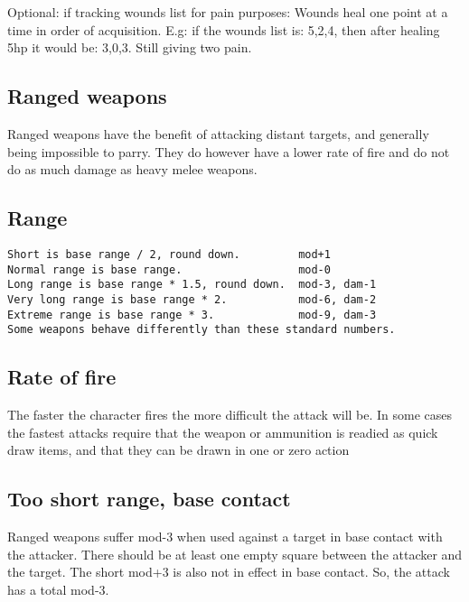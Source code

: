Optional: if tracking wounds list for pain purposes: Wounds heal one point at a time in order of acquisition. E.g: if the wounds list is: 5,2,4, then after healing 5hp it would be: 3,0,3. Still giving two pain.












\subsection*{Ranged weapons}
Ranged weapons have the benefit of attacking distant targets, and generally being impossible to parry. They do however have a lower rate of fire and do not do as much damage as heavy melee weapons.


\subsection*{Range}
\small \begin{verbatim}
Short is base range / 2, round down.         mod+1
Normal range is base range.                  mod-0
Long range is base range * 1.5, round down.  mod-3, dam-1
Very long range is base range * 2.           mod-6, dam-2
Extreme range is base range * 3.             mod-9, dam-3
Some weapons behave differently than these standard numbers.
\end{verbatim} \normalsize


\subsection*{Rate of fire}
The faster the character fires the more difficult the attack will be. In some cases the fastest attacks require that the weapon or ammunition is readied as quick draw items, and that they can be drawn in one or zero action


\subsection*{Too short range, base contact}
Ranged weapons suffer mod-3 when used against a target in base contact with the attacker. There should be at least one empty square between the attacker and the target. The short mod+3 is also not in effect in base contact. So, the attack has a total mod-3.

